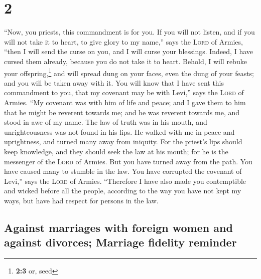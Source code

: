 \hypertarget{section-1}{%
\section{2}\label{section-1}}

 ``Now, you priests, this commandment is for you.
 If you will not listen, and if you will not take it to
heart, to give glory to my name,'' says the \textsc{Lord} of Armies,
``then I will send the curse on you, and I will curse your blessings.
Indeed, I have cursed them already, because you do not take it to heart.
 Behold, I will rebuke your offspring,\footnote{\textbf{2:3}
  or, seed} and will spread dung on your faces, even the dung of your
feasts; and you will be taken away with it.  You will know
that I have sent this commandment to you, that my covenant may be with
Levi,'' says the \textsc{Lord} of Armies.  ``My covenant
was with him of life and peace; and I gave them to him that he might be
reverent towards me; and he was reverent towards me, and stood in awe of
my name.  The law of truth was in his mouth, and
unrighteousness was not found in his lips. He walked with me in peace
and uprightness, and turned many away from iniquity.  For
the priest's lips should keep knowledge, and they should seek the law at
his mouth; for he is the messenger of the \textsc{Lord} of Armies.
 But you have turned away from the path. You have caused
many to stumble in the law. You have corrupted the covenant of Levi,''
says the \textsc{Lord} of Armies.  ``Therefore I have also
made you contemptible and wicked before all the people, according to the
way you have not kept my ways, but have had respect for persons in the
law.

\hypertarget{against-marriages-with-foreign-women-and-against-divorces-marriage-fidelity-reminder}{%
\subsection{Against marriages with foreign women and against divorces;
Marriage fidelity
reminder}\label{against-marriages-with-foreign-women-and-against-divorces-marriage-fidelity-reminder}}

